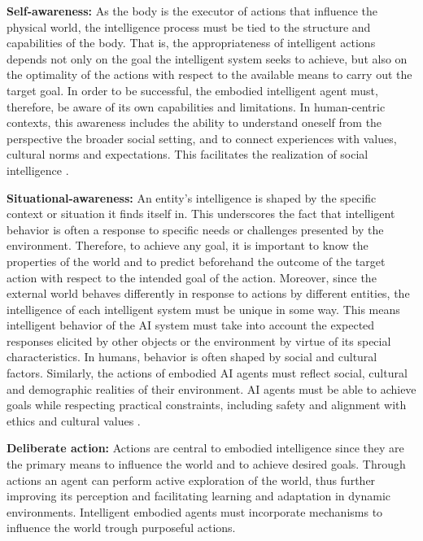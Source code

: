 \documentclass[10pt,journal,compsoc]{IEEEtran}
\begin{document}
	\textbf{Self-awareness:} As the body is the executor of actions that influence the physical world, the intelligence process must be tied to the structure and capabilities of the body. That is, the appropriateness of intelligent actions depends not only on the goal the intelligent system seeks to achieve, but also on the optimality of the actions with respect to the available means to carry out the target goal. In order to be successful, the embodied intelligent agent must, therefore, be aware of its own capabilities and limitations. In human-centric contexts, this awareness includes the ability to understand oneself from the perspective the broader social setting, and to connect experiences with values, cultural norms and expectations. This facilitates the realization of social intelligence \cite{williams2022belief,lindblom2015embodied,voestermans2013culture}.
	
	\textbf{Situational-awareness:} An entity's intelligence is shaped by the specific context or situation it finds itself in. This underscores the fact that intelligent behavior is often a response to specific needs or challenges presented by the environment. Therefore, to achieve any goal, it is important to know the properties of the world and to predict beforehand the outcome of the target action with respect to the intended goal of the action. Moreover, since the external world behaves differently in response to actions by different entities, the intelligence of each intelligent system must be unique in some way. This means intelligent behavior of the AI system must take into account the expected responses elicited by other objects or the environment by virtue of its special characteristics. In humans, behavior is often shaped by social and cultural factors. Similarly, the actions of embodied AI agents must reflect social, cultural and demographic realities of their environment. AI agents must be able to achieve goals while respecting practical constraints, including safety \cite{gao2024coca} and alignment with ethics and cultural values \cite{agarwal2024ethical}.
	
	\textbf{Deliberate action:} Actions are central to embodied intelligence since they are the primary means to influence the world and to achieve desired goals. Through actions an agent can perform active exploration of the world, thus further improving its perception and facilitating learning and adaptation in dynamic environments. Intelligent embodied agents must incorporate mechanisms to influence the world trough purposeful actions.
	
\end{document}
